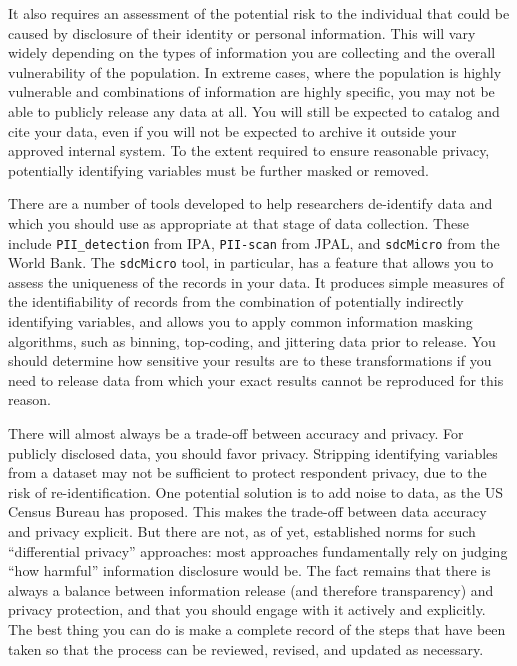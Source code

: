 It also requires an assessment of the potential risk to the individual
that could be caused by disclosure of their identity or personal information.
This will vary widely depending on the types of information
you are collecting and the overall vulnerability of the population.
In extreme cases, where the population is highly vulnerable
and combinations of information are highly specific,
you may not be able to publicly release any data at all.
You will still be expected to catalog and cite your data,
even if you will not be expected to archive it outside your approved internal system.
To the extent required to ensure reasonable privacy,
potentially identifying variables must be further masked or removed.

There are a number of tools developed to help researchers de-identify data
and which you should use as appropriate at that stage of data collection.
These include \texttt{PII\_detection}
from IPA,
\texttt{PII-scan}
from JPAL,
and \texttt{sdcMicro}
from the World Bank.
The \texttt{sdcMicro} tool, in particular, has a feature
that allows you to assess the uniqueness of the records in your data.
It produces simple measures of the identifiability of records from
the combination of potentially indirectly identifying variables,
and allows you to apply common information masking algorithms,
such as binning, top-coding, and jittering data prior to release.
You should determine how sensitive your results are to these transformations
if you need to release data from which your exact results
cannot be reproduced for this reason.

There will almost always be a trade-off between accuracy and privacy.
For publicly disclosed data, you should favor privacy.
Stripping identifying variables from a dataset may not be sufficient to protect respondent privacy,
due to the risk of re-identification.
One potential solution is to add noise to data, as the US Census Bureau has proposed.\cite{abowd2018us}
This makes the trade-off between data accuracy and privacy explicit.
But there are not, as of yet, established norms for such ``differential privacy'' approaches:
most approaches fundamentally rely on judging ``how harmful'' information disclosure would be.
The fact remains that there is always a balance between information release (and therefore transparency)
and privacy protection, and that you should engage with it actively and explicitly.
The best thing you can do is make a complete record of the steps that have been taken
so that the process can be reviewed, revised, and updated as necessary.

